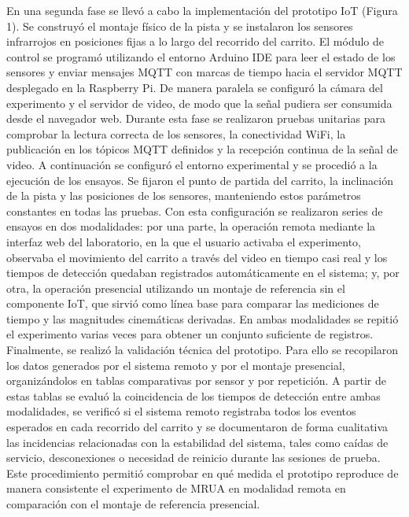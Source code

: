 \documentclass[journal,article,submit,pdftex]{Definitions/mdpi}
\begin{document}
En una segunda fase se llev\'o a cabo la implementaci\'on del prototipo IoT (Figura 1). Se construy\'o el montaje f\'isico de la pista y se instalaron los sensores infrarrojos en posiciones fijas a lo largo del recorrido del carrito. El m\'odulo de control se program\'o utilizando el entorno Arduino IDE para leer el estado de los sensores y enviar mensajes MQTT con marcas de tiempo hacia el servidor MQTT desplegado en la Raspberry Pi. De manera paralela se configur\'o la c\'amara del experimento y el servidor de video, de modo que la se\~nal pudiera ser consumida desde el navegador web. Durante esta fase se realizaron pruebas unitarias para comprobar la lectura correcta de los sensores, la conectividad WiFi, la publicaci\'on en los t\'opicos MQTT definidos y la recepci\'on continua de la se\~nal de video. A continuaci\'on se configur\'o el entorno experimental y se procedi\'o a la ejecuci\'on de los ensayos. Se fijaron el punto de partida del carrito, la inclinaci\'on de la pista y las posiciones de los sensores, manteniendo estos par\'ametros constantes en todas las pruebas. Con esta configuraci\'on se realizaron series de ensayos en dos modalidades: por una parte, la operaci\'on remota mediante la interfaz web del laboratorio, en la que el usuario activaba el experimento, observaba el movimiento del carrito a trav\'es del video en tiempo casi real y los tiempos de detecci\'on quedaban registrados autom\'aticamente en el sistema; y, por otra, la operaci\'on presencial utilizando un montaje de referencia sin el componente IoT, que sirvi\'o como l\'inea base para comparar las mediciones de tiempo y las magnitudes cinem\'aticas derivadas. En ambas modalidades se repiti\'o el experimento varias veces para obtener un conjunto suficiente de registros. Finalmente, se realiz\'o la validaci\'on t\'ecnica del prototipo. Para ello se recopilaron los datos generados por el sistema remoto y por el montaje presencial, organiz\'andolos en tablas comparativas por sensor y por repetici\'on. A partir de estas tablas se evalu\'o la coincidencia de los tiempos de detecci\'on entre ambas modalidades, se verific\'o si el sistema remoto registraba todos los eventos esperados en cada recorrido del carrito y se documentaron de forma cualitativa las incidencias relacionadas con la estabilidad del sistema, tales como ca\'idas de servicio, desconexiones o necesidad de reinicio durante las sesiones de prueba. Este procedimiento permiti\'o comprobar en qu\'e medida el prototipo reproduce de manera consistente el experimento de MRUA en modalidad remota en comparaci\'on con el montaje de referencia presencial.
\end{document}
